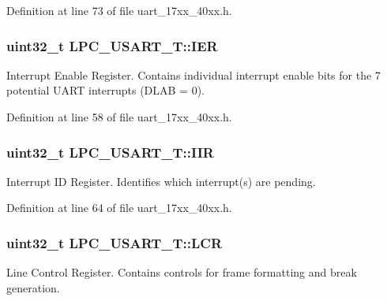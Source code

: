 Definition at line 73 of file uart\+\_\+17xx\+\_\+40xx.\+h.

\subsubsection[{\texorpdfstring{I\+ER}{IER}}]{ uint32\+\_\+t L\+P\+C\+\_\+\+U\+S\+A\+R\+T\+\_\+\+T\+::\+I\+ER}\hypertarget{structLPC__USART__T_a832413236bebfb6e6495c1055b9a85ae}{}\label{structLPC__USART__T_a832413236bebfb6e6495c1055b9a85ae}
Interrupt Enable Register. Contains individual interrupt enable bits for the 7 potential U\+A\+RT interrupts (D\+L\+AB = 0). 

Definition at line 58 of file uart\+\_\+17xx\+\_\+40xx.\+h.

\subsubsection[{\texorpdfstring{I\+IR}{IIR}}]{ uint32\+\_\+t L\+P\+C\+\_\+\+U\+S\+A\+R\+T\+\_\+\+T\+::\+I\+IR}\hypertarget{structLPC__USART__T_a470cdb18abc446a9768f404314c4a556}{}\label{structLPC__USART__T_a470cdb18abc446a9768f404314c4a556}
Interrupt ID Register. Identifies which interrupt(s) are pending. 

Definition at line 64 of file uart\+\_\+17xx\+\_\+40xx.\+h.

\subsubsection[{\texorpdfstring{L\+CR}{LCR}}]{ uint32\+\_\+t L\+P\+C\+\_\+\+U\+S\+A\+R\+T\+\_\+\+T\+::\+L\+CR}\hypertarget{structLPC__USART__T_aee4d95152fdd5222436368295e4307c2}{}\label{structLPC__USART__T_aee4d95152fdd5222436368295e4307c2}
Line Control Register. Contains controls for frame formatting and break generation. 

